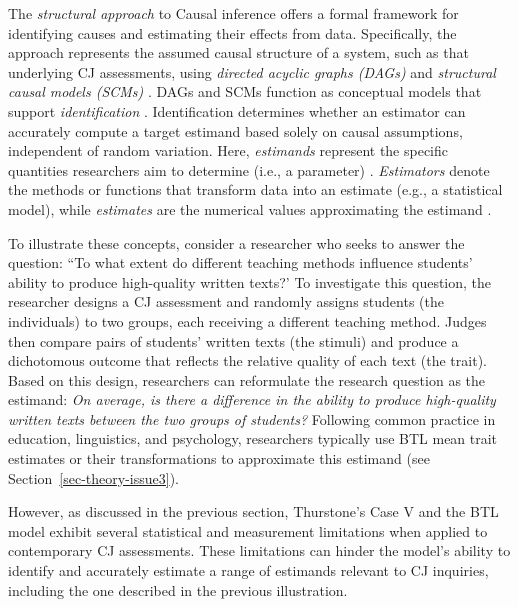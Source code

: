\documentclass[
  authoryear,
  review,
  1p]{elsarticle}
\begin{document}
The \emph{structural approach} to Causal inference
\citep{Pearl_2009, Pearl_et_al_2016} offers a formal framework for
identifying causes and estimating their effects from data. Specifically,
the approach represents the assumed causal structure of a system, such
as that underlying CJ assessments, using \emph{directed acyclic graphs
(DAGs)} and \emph{structural causal models (SCMs)}
\citep{Morgan_et_al_2014, Gross_et_al_2018, Neal_2020}. DAGs and SCMs
function as conceptual models that support \emph{identification}
\citep{Schuessler_et_al_2023}. Identification determines whether an
estimator can accurately compute a target estimand based solely on
causal assumptions, independent of random variation. Here,
\emph{estimands} represent the specific quantities researchers aim to
determine (i.e., a parameter) \citep{Everitt_et_al_2010}.
\emph{Estimators} denote the methods or functions that transform data
into an estimate (e.g., a statistical model), while \emph{estimates} are
the numerical values approximating the estimand
\citep{Neal_2020, Everitt_et_al_2010}.

To illustrate these concepts, consider a researcher who seeks to answer
the question: ``To what extent do different teaching methods influence
students' ability to produce high-quality written texts?' To investigate
this question, the researcher designs a CJ assessment and randomly
assigns students (the individuals) to two groups, each receiving a
different teaching method. Judges then compare pairs of students'
written texts (the stimuli) and produce a dichotomous outcome that
reflects the relative quality of each text (the trait). Based on this
design, researchers can reformulate the research question as the
estimand: \emph{On average, is there a difference in the ability to
produce high-quality written texts between the two groups of students?}
Following common practice in education, linguistics, and psychology,
researchers typically use BTL mean trait estimates or their
transformations to approximate this estimand (see
Section~\ref{sec-theory-issue3}).

However, as discussed in the previous section, Thurstone's Case V and
the BTL model exhibit several statistical and measurement limitations
when applied to contemporary CJ assessments. These limitations can
hinder the model's ability to identify and accurately estimate a range
of estimands relevant to CJ inquiries, including the one described in
the previous illustration.
\end{document}
